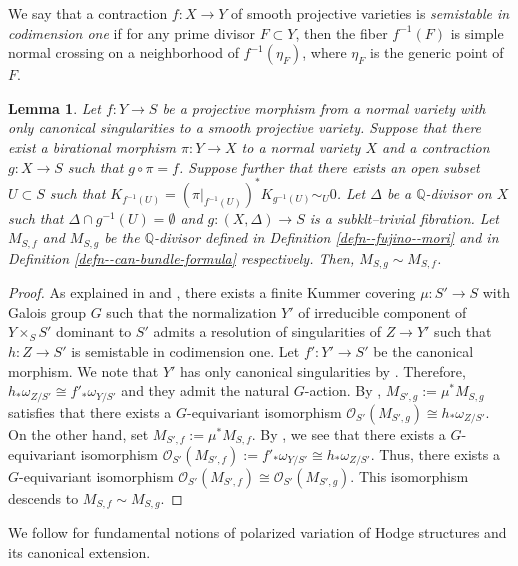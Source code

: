\documentclass[12pt,twoside]{amsart}
\newtheorem{lem}[thm]{Lemma}
\theoremstyle{definition}
\begin{document}
We say that a contraction $f\colon X\to Y$ of smooth projective varieties is {\it semistable in codimension one} if for any prime divisor $F\subset Y$, then the fiber $f^{-1}(F)$ is simple normal crossing on a neighborhood of $f^{-1}(\eta_F)$, where $\eta_F$ is the generic point of $F$.

\begin{lem}\label{lem--coincidence--moduli}
     Let $f\colon Y\to S$ be a projective morphism from a normal variety with only canonical singularities to a smooth projective variety.
     Suppose that there exist a birational morphism $\pi\colon Y\to X$ to a normal variety $X$ and a contraction $g\colon X\to S$ such that $g\circ \pi=f$.
     Suppose further that there exists an open subset $U\subset S$ such that $K_{f^{-1}(U)} = (\pi|_{f^{-1}(U)})^*K_{g^{-1}(U)} \sim_{U} 0$.
     Let $\Delta$ be a $\mathbb{Q}$-divisor on $X$ such that $\Delta\cap g^{-1}(U)=\emptyset$ and $g\colon (X,\Delta)\to S$ is a subklt--trivial fibration. 
     Let $M_{S,f}$ and $M_{S,g}$ be the $\mathbb{Q}$-divisor defined in Definition \ref{defn--fujino--mori} and in Definition \ref{defn--can-bundle-formula} respectively.
Then, $M_{S,g}\sim M_{S,f}$.
\end{lem}

\begin{proof}
As explained in \cite{A} and \cite{fujino--canonical-certain}, there exists a finite Kummer covering $\mu\colon S'\to S$ with Galois group $G$ such that the normalization $Y'$ of irreducible component of $Y\times_SS'$ dominant to $S'$ admits a resolution of singularities of $Z\to Y'$ such that $h\colon Z\to S'$ is semistable in codimension one.
Let $f'\colon Y'\to S'$ be the canonical morphism.
We note that $Y'$ has only canonical singularities by \cite[Proposition 5.20]{KM}.
Therefore, $h_*\omega_{Z/S'}\cong f'_*\omega_{Y/S'}$ and they admit the natural $G$-action. 
By \cite[Lemmas 5.1, 5.2]{A}, $M_{S',g}:=\mu^*M_{S,g}$ satisfies that there exists a $G$-equivariant isomorphism $\mathcal{O}_{S'}(M_{S',g})\cong h_*\omega_{Z/S'}$.
On the other hand, set $M_{S',f}:=\mu^*M_{S,f}$.
By \cite[Corollary 2.5]{FM2}, we see that there exists a $G$-equivariant isomorphism $\mathcal{O}_{S'}(M_{S',f}):=f'_*\omega_{Y/S'}\cong h_*\omega_{Z/S'}$.
Thus, there exists a $G$-equivariant isomorphism $\mathcal{O}_{S'}(M_{S',f})\cong \mathcal{O}_{S'}(M_{S',g})$.
This isomorphism descends to $M_{S,f}\sim M_{S,g}$. 
\end{proof}

We follow \cite[Section 2]{fujino--canonical-certain} for fundamental notions of polarized variation of Hodge structures and its canonical extension.
\end{document}
